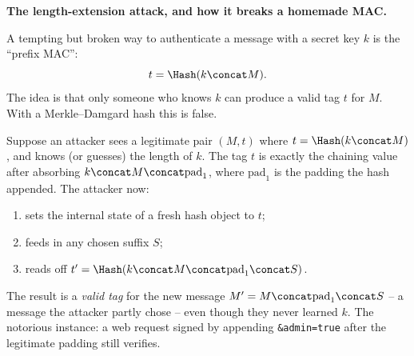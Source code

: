 \begin{attackbox}
\textbf{The length-extension attack, and how it breaks a homemade MAC.}

A tempting but broken way to authenticate a message with a secret key $k$ is the ``prefix MAC'':
\[
  t = \Hash(k \concat M).
\]
The idea is that only someone who knows $k$ can produce a valid tag $t$ for $M$. With a Merkle--Damgard hash this is false.

Suppose an attacker sees a legitimate pair $(M, t)$ where $t = \Hash(k \concat M)$, and knows (or guesses) the length of $k$. The tag $t$ is exactly the chaining value after absorbing $k \concat M \concat \text{pad}_1$, where $\text{pad}_1$ is the padding the hash appended. The attacker now:
\begin{enumerate}
  \item sets the internal state of a fresh hash object to $t$;
  \item feeds in any chosen suffix $S$;
  \item reads off $t' = \Hash(k \concat M \concat \text{pad}_1 \concat S)$.
\end{enumerate}
The result is a \emph{valid tag} for the new message $M' = M \concat \text{pad}_1 \concat S$ -- a message the attacker partly chose -- even though they never learned $k$. The notorious instance: a web request signed by appending \verb|&admin=true| after the legitimate padding still verifies.
\end{attackbox}

